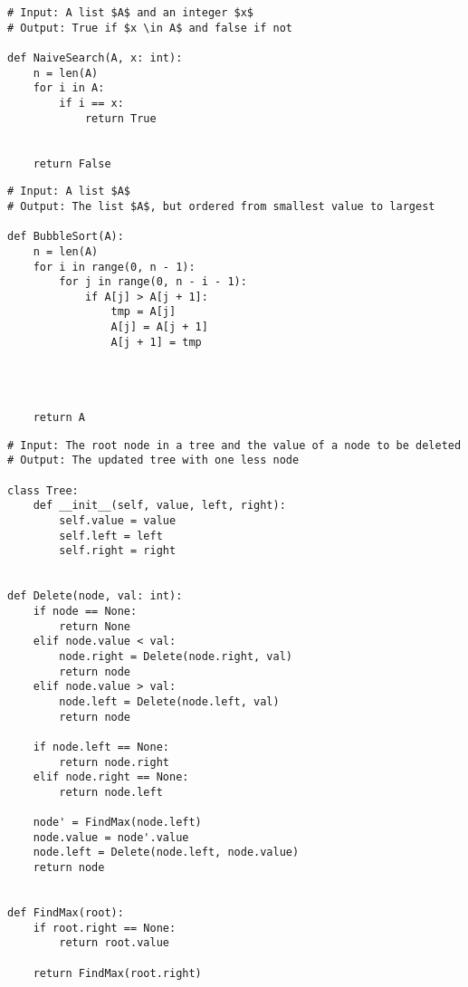 \begin{lstlisting}[caption={The result of transpiling \Cref{naiveSearchGourmet} to Pytite.}, captionpos=b, label={naiveSearchPytite}]
# Input: A list $A$ and an integer $x$
# Output: True if $x \in A$ and false if not

def NaiveSearch(A, x: int):
    n = len(A)
    for i in A:
        if i == x:
            return True


    return False
\end{lstlisting}

\begin{lstlisting}[caption={The result of transpiling \Cref{bubbleSortGourmet} to Pytite.}, captionpos=b, label={bubbleSortPytite}]
# Input: A list $A$
# Output: The list $A$, but ordered from smallest value to largest

def BubbleSort(A):
    n = len(A)
    for i in range(0, n - 1):
        for j in range(0, n - i - 1):
            if A[j] > A[j + 1]:
                tmp = A[j]
                A[j] = A[j + 1]
                A[j + 1] = tmp




    return A
\end{lstlisting}

\begin{lstlisting}[caption={The result of transpiling \Cref{deleteBSTGourmet} to Pytite.}, captionpos=b, label={deleteBSTPytite}]
# Input: The root node in a tree and the value of a node to be deleted
# Output: The updated tree with one less node

class Tree:
    def __init__(self, value, left, right):
        self.value = value
        self.left = left
        self.right = right


def Delete(node, val: int):
    if node == None:
        return None
    elif node.value < val:
        node.right = Delete(node.right, val)
        return node
    elif node.value > val:
        node.left = Delete(node.left, val)
        return node

    if node.left == None:
        return node.right
    elif node.right == None:
        return node.left

    node' = FindMax(node.left)
    node.value = node'.value
    node.left = Delete(node.left, node.value)
    return node


def FindMax(root):
    if root.right == None:
        return root.value

    return FindMax(root.right)
\end{lstlisting}

